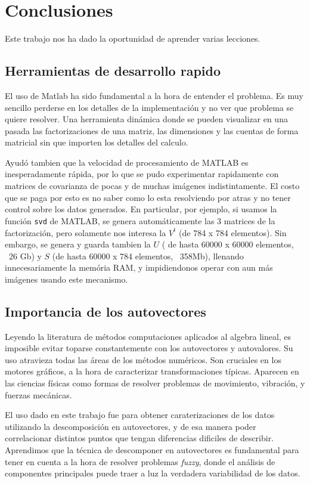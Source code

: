 \section{Conclusiones}

Este trabajo nos ha dado la oportunidad de aprender varias lecciones.

\subsection{Herramientas de desarrollo rapido}

El uso de Matlab ha sido fundamental a la hora de entender el problema.
Es muy sencillo perderse en los detalles de la implementaci\'on y no ver que
problema se quiere resolver. Una herramienta din\'amica donde se pueden visualizar
en una pasada las factorizaciones de una matriz, las dimensiones y las cuentas
de forma matricial sin que importen los detalles del calculo.

Ayud\'o tambien que la velocidad de procesamiento de MATLAB es inesperadamente
r\'apida, por lo que se pudo experimentar rapidamente con matrices de covarianza
de pocas y de muchas im\'agenes indistintamente. El costo que se paga por esto es
no saber como lo esta resolviendo por atras y no tener control sobre los datos generados.
En particular, por ejemplo, si usamos la funci\'on \texttt{svd} de MATLAB, se genera
autom\'aticamente las 3 matrices de la factorizaci\'on, pero solamente nos interesa
la $V^t$ (de 784 x 784 elementos). Sin embargo, se genera y guarda tambien la $U$ ( de hasta
60000 x 60000 elementos, ~26 Gb) y $S$ (de hasta 60000 x 784 elementos, ~358Mb), llenando innecesariamente
la mem\'oria RAM, y impidiendonos operar con aun m\'as im\'agenes usando este mecanismo.

\subsection{Importancia de los autovectores}

Leyendo la literatura de m\'etodos computaciones aplicados al algebra lineal, es
imposible evitar toparse constantemente con los autovectores y autovalores. Su
uso atravieza todas las \'areas de los m\'etodos num\'ericos. Son cruciales
en los motores gr\'aficos, a la hora de caracterizar transformaciones t\'ipicas.
Aparecen en las ciencias f\'isicas como formas de resolver problemas de movimiento,
vibraci\'on, y fuerzas mec\'anicas.

El uso dado en este trabajo fue para obtener caraterizaciones de los datos utilizando la
descomposici\'on en autovectores, y de esa manera poder correlacionar distintos puntos que
tengan diferencias dificiles de describir. Aprendimos que la t\'ecnica de descomponer en autovectores
es fundamental para tener en cuenta a la hora de resolver problemas \textit{fuzzy}, donde
el an\'alisis de componentes principales puede traer a luz la verdadera variabilidad de los datos.


